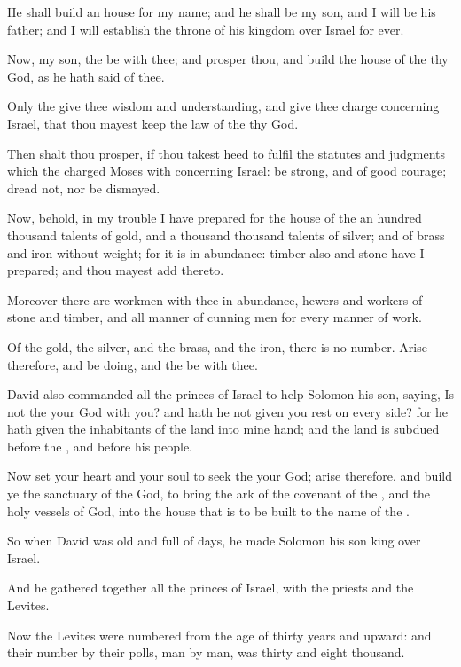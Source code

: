 \Verse He shall build an house for my name; and he shall be my son, and I will be his father; and I will establish the throne of his kingdom over Israel for ever.

\Verse Now, my son, the \LORD be with thee; and prosper thou, and build the house of the \LORD thy God, as he hath said of thee.

\Verse Only the \LORD give thee wisdom and understanding, and give thee charge concerning Israel, that thou mayest keep the law of the \LORD thy God.

\Verse Then shalt thou prosper, if thou takest heed to fulfil the statutes and judgments which the \LORD charged Moses with concerning Israel: be strong, and of good courage; dread not, nor be dismayed.

\Verse Now, behold, in my trouble I have prepared for the house of the \LORD an hundred thousand talents of gold, and a thousand thousand talents of silver; and of brass and iron without weight; for it is in abundance: timber also and stone have I prepared; and thou mayest add thereto.

\Verse Moreover there are workmen with thee in abundance, hewers and workers of stone and timber, and all manner of cunning men for every manner of work.

\Verse Of the gold, the silver, and the brass, and the iron, there is no number. Arise therefore, and be doing, and the \LORD be with thee.

\Verse David also commanded all the princes of Israel to help Solomon his son, saying, \Verse Is not the \LORD your God with you? and hath he not given you rest on every side? for he hath given the inhabitants of the land into mine hand; and the land is subdued before the \LORD, and before his people.

\Verse Now set your heart and your soul to seek the \LORD your God; arise therefore, and build ye the sanctuary of the \LORD God, to bring the ark of the covenant of the \LORD, and the holy vessels of God, into the house that is to be built to the name of the \LORD.


\Chapter
\Verse So when David was old and full of days, he made Solomon his son king over Israel.

\Verse And he gathered together all the princes of Israel, with the priests and the Levites.

\Verse Now the Levites were numbered from the age of thirty years and upward: and their number by their polls, man by man, was thirty and eight thousand.

